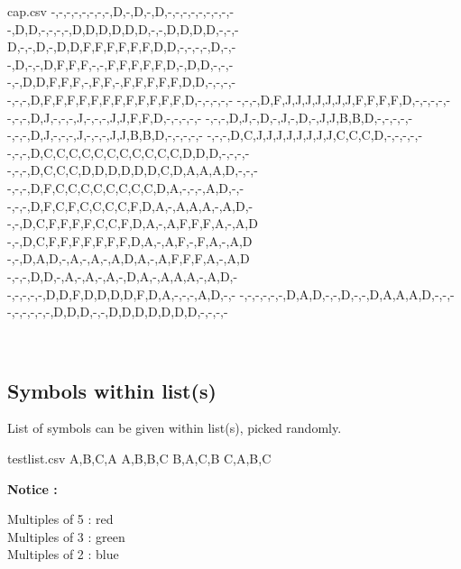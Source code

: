 \documentclass{article}
\begin{document}
\begin{PresentationCode}{}

\begin{filecontents*}[overwrite]{cap.csv}
	-,-,-,-,-,-,-,-,D,-,D,-,D,-,-,-,-,-,-,-,-,-
	-,D,D,-,-,-,-,D,D,D,D,D,D,-,-,D,D,D,D,-,-,-
	D,-,-,D,-,D,D,F,F,F,F,F,F,D,D,-,-,-,-,D,-,-
	-,D,-,-,D,F,F,F,-,-,F,F,F,F,F,D,-,D,D,-,-,-
	-,-,D,D,F,F,F,-,F,F,-,F,F,F,F,F,D,D,-,-,-,-
	-,-,-,D,F,F,F,F,F,F,F,F,F,F,F,F,D,-,-,-,-,-
	-,-,-,D,F,J,J,J,J,J,J,J,F,F,F,F,D,-,-,-,-,-
	-,-,-,D,J,-,-,-,J,-,-,-,J,J,F,F,D,-,-,-,-,-
	-,-,-,D,J,-,D,-,J,-,D,-,J,J,B,B,D,-,-,-,-,-
	-,-,-,D,J,-,-,-,J,-,-,-,J,J,B,B,D,-,-,-,-,-
	-,-,-,D,C,J,J,J,J,J,J,J,J,C,C,C,D,-,-,-,-,-
	-,-,-,D,C,C,C,C,C,C,C,C,C,C,C,D,D,D,-,-,-,-
	-,-,-,D,C,C,C,D,D,D,D,D,D,C,D,A,A,A,D,-,-,-
	-,-,-,D,F,C,C,C,C,C,C,C,C,D,A,-,-,-,A,D,-,-
	-,-,-,D,F,C,F,C,C,C,C,F,D,A,-,A,A,A,-,A,D,-
	-,-,D,C,F,F,F,F,C,C,F,D,A,-,A,F,F,F,A,-,A,D
	-,-,D,C,F,F,F,F,F,F,F,D,A,-,A,F,-,F,A,-,A,D
	-,-,D,A,D,-,A,-,A,-,A,D,A,-,A,F,F,F,A,-,A,D
	-,-,-,D,D,-,A,-,A,-,A,-,D,A,-,A,A,A,-,A,D,-
	-,-,-,-,-,D,D,F,D,D,D,D,F,D,A,-,-,-,A,D,-,-
	-,-,-,-,-,-,D,A,D,-,-,D,-,-,D,A,A,A,D,-,-,-
	-,-,-,-,-,-,D,D,D,-,-,D,D,D,D,D,D,D,-,-,-,-
\end{filecontents*}

~~
\end{PresentationCode}

\pagebreak

\subsection{Symbols within list(s)}

List of symbols can be given within list(s), picked randomly.

\begin{PresentationCode}{}
\begin{filecontents*}[overwrite]{testlist.csv}
A,B,C,A
A,B,B,C
B,A,C,B
C,A,B,C
\end{filecontents*}

\textbf{Notice : }

Multiples of 5 : red\\
Multiples of 3 : green\\
Multiples of 2 : blue

\hspace{5mm}
\hspace{5mm}
\end{PresentationCode}
\end{document}
